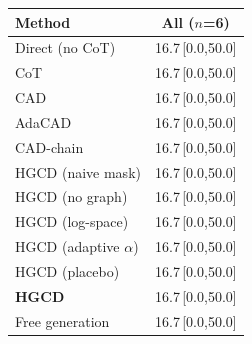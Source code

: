 \begin{tabular}{lc}
\toprule
Method & All ($n$=6) \\
\midrule
Direct (no CoT) & 16.7\,{\scriptsize[0.0,50.0]} \\
CoT & 16.7\,{\scriptsize[0.0,50.0]} \\
CAD & 16.7\,{\scriptsize[0.0,50.0]} \\
AdaCAD & 16.7\,{\scriptsize[0.0,50.0]} \\
CAD-chain & 16.7\,{\scriptsize[0.0,50.0]} \\
HGCD (naive mask) & 16.7\,{\scriptsize[0.0,50.0]} \\
HGCD (no graph) & 16.7\,{\scriptsize[0.0,50.0]} \\
HGCD (log-space) & 16.7\,{\scriptsize[0.0,50.0]} \\
HGCD (adaptive $\alpha$) & 16.7\,{\scriptsize[0.0,50.0]} \\
HGCD (placebo) & 16.7\,{\scriptsize[0.0,50.0]} \\
\textbf{HGCD} & 16.7\,{\scriptsize[0.0,50.0]} \\
Free generation & 16.7\,{\scriptsize[0.0,50.0]} \\
\bottomrule
\end{tabular}
